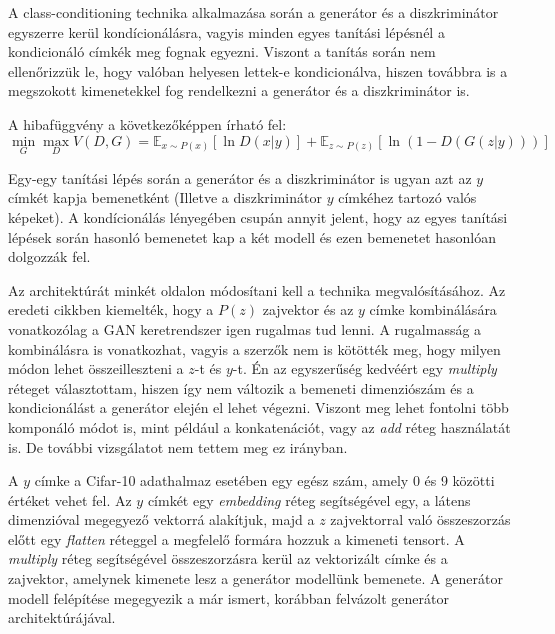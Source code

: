 A class-conditioning technika alkalmazása során a generátor és a diszkriminátor egyszerre kerül kondícionálásra, vagyis minden egyes tanítási lépésnél a kondicionáló címkék meg fognak egyezni. Viszont a tanítás során nem ellenőrizzük le, hogy valóban helyesen lettek-e kondicionálva, hiszen továbbra is a megszokott kimenetekkel fog rendelkezni a generátor és a diszkriminátor is.

A hibafüggvény a következőképpen írható fel:
$$\min_{G}\max_{D}V(D, G) =  \mathbb{E}_{x \sim P(x)} \left[\ln D(x|y) \right] + \mathbb{E}_{z \sim P(z)} \left[\ln(1 - D(G(z|y))) \right]$$

Egy-egy tanítási lépés során a generátor és a diszkriminátor is ugyan azt az $y$ címkét kapja bemenetként (Illetve a diszkriminátor $y$ címkéhez tartozó valós képeket). A kondícionálás lényegében csupán annyit jelent, hogy az egyes tanítási lépések során hasonló bemenetet kap a két modell és ezen bemenetet hasonlóan dolgozzák fel.

Az architektúrát minkét oldalon módosítani kell a technika megvalósításához. Az eredeti cikkben \cite{mirza2014conditional} kiemelték, hogy a $P(z)$ zajvektor és az $y$ címke kombinálására vonatkozólag a GAN keretrendszer igen rugalmas tud lenni. A rugalmasság a kombinálásra is vonatkozhat, vagyis a szerzők nem is kötötték meg, hogy milyen módon lehet összeilleszteni a $z$-t és $y$-t. Én az egyszerűség kedvéért egy \textit{multiply} réteget választottam, hiszen így nem változik a bemeneti dimenziószám és a kondicionálást a generátor elején el lehet végezni. Viszont meg lehet fontolni több komponáló módot is, mint például a konkatenációt, vagy az \textit{add} réteg használatát is. De további vizsgálatot nem tettem meg ez irányban.

A $y$ címke a Cifar-10 adathalmaz esetében egy egész szám, amely 0 és 9 közötti értéket vehet fel. Az $y$ címkét egy \textit{embedding} réteg segítségével egy, a látens dimenzióval megegyező vektorrá alakítjuk, majd a $z$ zajvektorral való összeszorzás előtt egy \textit{flatten} réteggel a megfelelő formára hozzuk a kimeneti tensort.
A \textit{multiply} réteg segítségével összeszorzásra kerül az vektorizált címke és a zajvektor, amelynek kimenete lesz a generátor modellünk bemenete. A generátor modell felépítése megegyezik a már ismert, korábban felvázolt generátor architektúrájával.

